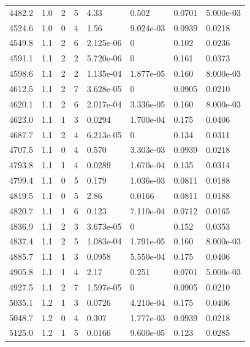 \documentclass[preview]{standalone}
\begin{document}
{{{\begin{tabular}{L{1.2cm}C{1.2cm} C{0.3cm}C{0.5cm} C{1.4cm}C{1.4cm} C{1.4cm}C{1.4cm}}
  4482.2  &   1.0  & 2     &  5 &  4.33  & 0.502  & 0.0701 &  5.000e-03   \\ 
  4524.6  &   1.0  & 0     &  4 &  1.56  & 9.024e-03  & 0.0939 &  0.0218   \\ 
  4549.8  &   1.1  & 2     &  6 &  2.125e-06  & 0  & 0.102 &  0.0236   \\ 
  4591.1  &   1.1  & 2     &  2 &  5.720e-06  & 0  & 0.161 &  0.0373   \\ 
  4598.6  &   1.1  & 2     &  2 &  1.135e-04  & 1.877e-05  & 0.160 &  8.000e-03   \\ 
  4612.5  &   1.1  & 2     &  7 &  3.628e-05  & 0  & 0.0905 &  0.0210   \\ 
  4620.1  &   1.1  & 2     &  6 &  2.017e-04  & 3.336e-05  & 0.160 &  8.000e-03   \\ 
  4623.0  &   1.1  & 1     &  3 &  0.0294  & 1.700e-04  & 0.175 &  0.0406   \\ 
  4687.7  &   1.1  & 2     &  4 &  6.213e-05  & 0  & 0.134 &  0.0311   \\ 
  4707.5  &   1.1  & 0     &  4 &  0.570  & 3.303e-03  & 0.0939 &  0.0218   \\ 
  4793.8  &   1.1  & 1     &  4 &  0.0289  & 1.670e-04  & 0.135 &  0.0314   \\ 
  4799.4  &   1.1  & 0     &  5 &  0.179  & 1.036e-03  & 0.0811 &  0.0188   \\ 
  4819.5  &   1.1  & 0     &  5 &  2.86  & 0.0166  & 0.0811 &  0.0188   \\ 
  4820.7  &   1.1  & 1     &  6 &  0.123  & 7.110e-04  & 0.0712 &  0.0165   \\ 
  4836.9  &   1.1  & 2     &  3 &  3.673e-05  & 0  & 0.152 &  0.0353   \\ 
  4837.4  &   1.1  & 2     &  5 &  1.083e-04  & 1.791e-05  & 0.160 &  8.000e-03   \\ 
  4885.7  &   1.1  & 1     &  3 &  0.0958  & 5.550e-04  & 0.175 &  0.0406   \\ 
  4905.8  &   1.1  & 1     &  4 &  2.17  & 0.251  & 0.0701 &  5.000e-03   \\ 
  4927.5  &   1.1  & 2     &  7 &  1.597e-05  & 0  & 0.0905 &  0.0210   \\ 
  5035.1  &   1.2  & 1     &  3 &  0.0726  & 4.210e-04  & 0.175 &  0.0406   \\ 
  5048.7  &   1.2  & 0     &  4 &  0.307  & 1.777e-03  & 0.0939 &  0.0218   \\ 
  5125.0  &   1.2  & 1     &  5 &  0.0166  & 9.600e-05  & 0.123 &  0.0285   \\ 

\end{tabular}}}}
\end{document}
